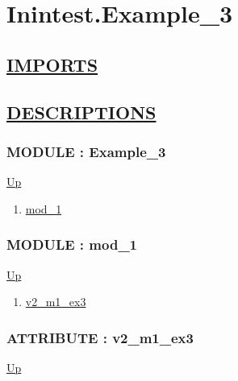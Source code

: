 \chapter*{Inintest.Example\_3}
\hypertarget{ecldoc:toc:Inintest.Example_3}{}

\section*{\underline{IMPORTS}}

\section*{\underline{DESCRIPTIONS}}
\subsection*{MODULE : Example\_3}
\hypertarget{ecldoc:Inintest.Example_3}{}
\par
\begin{minipage}[t]{\textwidth}
\begin{flushleft}
  
\end{flushleft}
\end{minipage}
\hyperlink{ecldoc:toc:Inintest}{Up} \\
\par
\par
\begin{enumerate}
\item \hyperlink{ecldoc:Inintest.Example_3.mod_1}{mod\_1}
\end{enumerate}
\subsection*{MODULE : mod\_1}
\hypertarget{ecldoc:Inintest.Example_3.mod_1}{}
\par
\begin{minipage}[t]{\textwidth}
\begin{flushleft}
  
\end{flushleft}
\end{minipage}
\hyperlink{ecldoc:Inintest.Example_3}{Up} \\
\par
\par
\begin{enumerate}
\item \hyperlink{ecldoc:inintest.example_3.mod_1.v2_m1_ex3}{v2\_m1\_ex3}
\end{enumerate}
\subsection*{ATTRIBUTE : v2\_m1\_ex3}
\hypertarget{ecldoc:inintest.example_3.mod_1.v2_m1_ex3}{}
\par
\begin{minipage}[t]{\textwidth}
\begin{flushleft}
  
\end{flushleft}
\end{minipage}
\hyperlink{ecldoc:Inintest.Example_3.mod_1}{Up} \\
\par
\par


